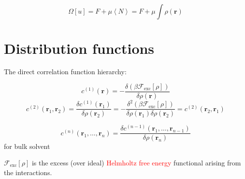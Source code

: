 \[
\Omega\left[u\right]=F+\mu\left\langle N\right\rangle =F+\mu\int\rho(\mathbf{r})
\]



\section{Distribution functions}

The direct correlation function hierarchy:

\[
c^{(1)}(\mathbf{r})=-\dfrac{\delta(\beta\mathcal{F}_{\mathrm{exc}}[\rho])}{\delta\rho(\mathbf{r})}
\]
\[
c^{(2)}(\mathbf{r}_{1},\mathbf{r}_{2})=\dfrac{\delta c^{(1)}(\mathbf{r}_{1})}{\delta\rho(\mathbf{r}_{2})}=-\dfrac{\delta^{2}(\beta\mathcal{F}_{\mathrm{exc}}[\rho])}{\delta\rho(\mathbf{r}_{1})\delta\rho(\mathbf{r}_{2})}=c^{(2)}(\mathbf{r}_{2},\mathbf{r}_{1})
\]


\[
c^{(n)}(\mathbf{r}_{1},\ldots,\mathbf{r}_{n})=\dfrac{\delta c^{(n-1)}(\mathbf{r}_{1},\ldots,\mathbf{r}_{n-1})}{\delta\rho(\mathbf{r}_{n})}
\]
for bulk solvent

$\mathcal{F}_{\mathrm{exc}}[\rho]$ is the excess (over ideal) \textcolor{red}{Helmholtz
free energy} functional arising from the interactions.
